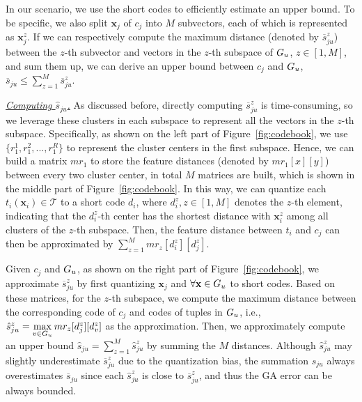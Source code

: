   
  
  In our scenario, we use the short codes to efficiently estimate an upper bound.
  To be specific, we also split  $\mathbf{x}_{j}$ of $c_j$  into $M$ subvectors, each of which is represented  as $\mathbf{x}^z_{j}$. If we can respectively compute the maximum distance (denoted by $\overline{s}_{ju}^z$) between the $z$-th subvector and vectors in the $z$-th  subspace of $G_u$, $z\in [1,M]$, and sum them up, we can derive  an upper bound  between $c_j$ and $G_u$, \ie $ \overline{s}_{ju} \leq  \sum_{z = 1}^M  \overline{s}_{ju}^z$.

\noindent  \underline{\textit{Computing $\hat{s}_{ju}$.}}
As discussed before,
directly computing $\overline{s}_{ju}^z$ is time-consuming, so we leverage these  clusters in each subspace to represent all the vectors in the $z$-th subspace. %
%
 Specifically, as shown on the left part of Figure~\ref{fig:codebook}, we use $\{r_1^1, r_1^2,..., r_1^R\}$ to represent the  cluster centers in the first subspace. %
 Hence, we can build a matrix $mr_1$ to store the feature distances (denoted by $mr_1[x][y]$) between every two cluster center, in total  $M$ matrices are built, which is shown in the middle part of Figure~\ref{fig:codebook}.
 In this way, we can quantize each $t_i (\mathbf{x}_i) \in \mathcal{T}$  to a short code $d_i$, where $d_i^z, z\in[1,M]$  denotes the $z$-th element, indicating that the $d_i^z$-th center has the shortest distance with $\mathbf{x}_i^z$ among all clusters of the $z$-th subspace. 
 Then, the feature distance between  $t_i$ and $c_j$ can then be approximated by $\sum_{z=1}^{M}mr_z[d_i^z][d_j^z]$.

Given $c_j$ and $G_u$, as shown on the right part of Figure~\ref{fig:codebook}, we approximate $\overline{s}_{ju}^z$ by first quantizing $\mathbf{x}_{j}$ and  $\forall \mathbf{x} \in G_u$ to short codes. Based on these matrices, for the $z$-th subspace, we compute the maximum distance between the corresponding code of $c_j$ and codes of tuples in $G_u$, i.e., $\hat{s}_{ju}^z = \max\limits_{v\in G_u}mr_z[d_{j}^z][d_v^z]$ as the approximation. Then, we approximately compute an upper bound $\hat{s}_{ju}=\sum_{z=1}^{M}\hat{s}_{ju}^z$ by summing the $M$ distances. Although $\hat{s}_{ju}^z$ may slightly underestimate $\overline{s}^z_{ju}$ due to the quantization bias, the summation $\hat{s}_{ju}$ always overestimates $\overline{s}_{ju}$ since each $\hat{s}_{ju}^z$ is close to $\overline{s}^z_{ju}$, and thus the GA error can be always bounded.

